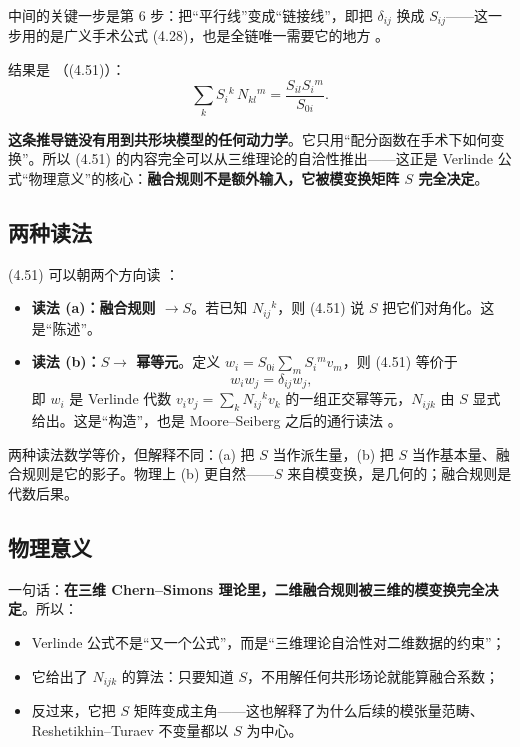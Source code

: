 中间的关键一步是第 6 步：把“平行线”变成“链接线”，即把 $\delta_{ij}$ 换成 $S_{ij}$——这一步用的是广义手术公式 (4.28)，也是全链唯一需要它的地方 \ours。

结果是 （(4.51)）：
\begin{equation}
\sum_k S_i{}^k\,N_{kl}{}^m=\frac{S_{il}S_i{}^m}{S_{0i}} .
\label{eq:verlinde-key}
\end{equation}

\begin{keypoint}
\textbf{这条推导链没有用到共形块模型的任何动力学}。它只用“配分函数在手术下如何变换”。所以 (4.51) 的内容完全可以从三维理论的自洽性推出——这正是 Verlinde 公式“物理意义”的核心：\textbf{融合规则不是额外输入，它被模变换矩阵 $S$ 完全决定}。
\end{keypoint}

\subsection{两种读法}

(4.51) 可以朝两个方向读 \ours：

\begin{itemize}[leftmargin=1.6em]
\item \textbf{读法 (a)：融合规则 $\to S$}。若已知 $N_{ij}{}^k$，则 (4.51) 说 $S$ 把它们对角化。这是“陈述”。
\item \textbf{读法 (b)：$S\to$ 幂等元}。定义 $w_i=S_{0i}\sum_m S_i{}^m v_m$，则 (4.51) 等价于
\begin{equation}
w_i w_j=\delta_{ij}w_j ,
\end{equation}
即 $w_i$ 是 Verlinde 代数 $v_i v_j=\sum_k N_{ij}{}^k v_k$ 的一组正交幂等元，$N_{ijk}$ 由 $S$ 显式给出。这是“构造”，也是 Moore--Seiberg 之后的通行读法 。
\end{itemize}

两种读法数学等价，但解释不同：(a) 把 $S$ 当作派生量，(b) 把 $S$ 当作基本量、融合规则是它的影子。物理上 (b) 更自然——$S$ 来自模变换，是几何的；融合规则是代数后果。

\subsection{物理意义}

一句话：\textbf{在三维 Chern--Simons 理论里，二维融合规则被三维的模变换完全决定}。所以：

\begin{itemize}[leftmargin=1.6em]
\item Verlinde 公式不是“又一个公式”，而是“三维理论自洽性对二维数据的约束”；
\item 它给出了 $N_{ijk}$ 的算法：只要知道 $S$，不用解任何共形场论就能算融合系数；
\item 反过来，它把 $S$ 矩阵变成主角——这也解释了为什么后续的模张量范畴、Reshetikhin--Turaev 不变量都以 $S$ 为中心。
\end{itemize}

